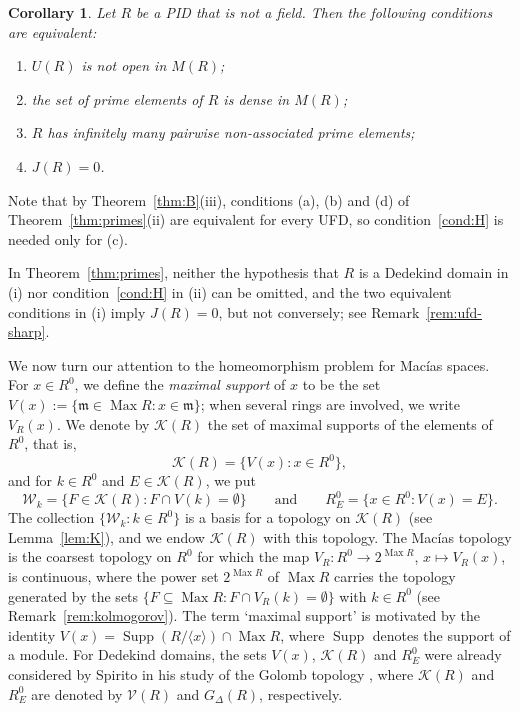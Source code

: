 \documentclass[12pt,reqno,a4paper]{amsart}
\newcommand{\K}{\mathcal{K}}
\newcommand{\W}{\mathcal{W}}
\newcommand{\m}{\mathfrak{m}}
\DeclareMathOperator{\Max}{Max}
\theoremstyle{plain}
\newtheorem{corollary}[theorem]{Corollary}
\theoremstyle{definition}
\begin{document}
\begin{corollary}\label{cor:pid-four}
Let $R$ be a PID that is not a field. Then the following conditions are equivalent:
\begin{enumerate}[label=\textup{(\alph*)}]
\item $U(R)$ is not open in $M(R)$;
\item the set of prime elements of $R$ is dense in $M(R)$;
\item $R$ has infinitely many pairwise non-associated prime elements;
\item $J(R)=0$.
\end{enumerate}
\end{corollary}

Note that by Theorem~\ref{thm:B}(iii), conditions (a), (b) and (d) of Theorem~\ref{thm:primes}(ii) are equivalent for every UFD, so condition~\ref{cond:H} is needed only for (c).

In Theorem~\ref{thm:primes}, neither the hypothesis that $R$ is a Dedekind domain in (i) nor condition~\ref{cond:H} in (ii) can be omitted, and the two equivalent conditions in (i) imply $J(R)=0$, but not conversely; see Remark~\ref{rem:ufd-sharp}.

We now turn our attention to the homeomorphism problem for Mac\'ias spaces. For $x\in R^0$, we define the \emph{maximal support} of $x$ to be the set $V(x):=\{\m\in\Max R:x\in\m\}$; when several rings are involved, we write $V_R(x)$. We denote by $\K(R)$ the set of maximal supports of the elements of $R^0$, that is,
\[
\K(R)=\{V(x):x\in R^0\},
\]
and for $k\in R^0$ and $E\in\K(R)$, we put
\[
\W_k=\{F\in\K(R):F\cap V(k)=\emptyset\}\qquad\text{and}\qquad R^0_E=\{x\in R^0:V(x)=E\}.
\]
The collection $\{\W_k:k\in R^0\}$ is a basis for a topology on $\K(R)$ (see Lemma~\ref{lem:K}), and we endow $\K(R)$ with this topology. The Mac\'ias topology is the coarsest topology on $R^0$ for which the map $V_R\colon R^0\to2^{\Max R}$, $x\mapsto V_R(x)$, is continuous, where the power set $2^{\Max R}$ of $\Max R$ carries the topology generated by the sets $\{F\subseteq\Max R:F\cap V_R(k)=\emptyset\}$ with $k\in R^0$ (see Remark~\ref{rem:kolmogorov}). The term `maximal support' is motivated by the identity $V(x)=\operatorname{Supp}(R/\langle x\rangle)\cap\Max R$, where $\operatorname{Supp}$ denotes the support of a module. For Dedekind domains, the sets $V(x)$, $\K(R)$ and $R^0_E$ were already considered by Spirito in his study of the Golomb topology \cite{Spirito}, where $\K(R)$ and $R^0_E$ are denoted by $\boldsymbol{\mathcal V}(R)$ and $G_\Delta(R)$, respectively.
\end{document}
